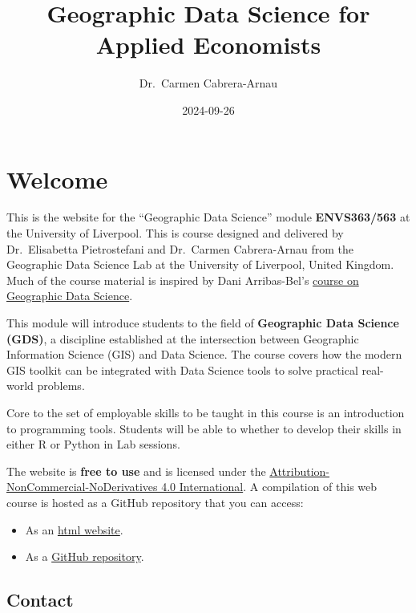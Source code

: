 \documentclass[
  letterpaper,
  DIV=11,
  numbers=noendperiod]{scrreprt}
\title{Geographic Data Science for Applied Economists}
\author{Dr.~Carmen Cabrera-Arnau}
\date{2024-09-26}
\providecommand{\tightlist}{%
  \setlength{\itemsep}{0pt}\setlength{\parskip}{0pt}}\usepackage{longtable,booktabs,array}
\renewcommand*\contentsname{Table of contents}
\newcommand\contentsname{Table of contents}
\begin{document}
\maketitle

\renewcommand*\contentsname{Table of contents}
{
\hypersetup{linkcolor=}
\setcounter{tocdepth}{2}
\tableofcontents
}


\chapter*{Welcome}\label{welcome}


This is the website for the ``Geographic Data Science'' module
\textbf{ENVS363/563} at the University of Liverpool. This is course
designed and delivered by Dr.~Elisabetta Pietrostefani and Dr.~Carmen
Cabrera-Arnau from the Geographic Data Science Lab at the University of
Liverpool, United Kingdom. Much of the course material is inspired by
Dani Arribas-Bel's
\href{https://darribas.org/gds_course/content/home.html}{course on
Geographic Data Science}.

This module will introduce students to the field of \textbf{Geographic
Data Science (GDS)}, a discipline established at the intersection
between Geographic Information Science (GIS) and Data Science. The
course covers how the modern GIS toolkit can be integrated with Data
Science tools to solve practical real-world problems.

Core to the set of employable skills to be taught in this course is an
introduction to programming tools. Students will be able to whether to
develop their skills in either R or Python in Lab sessions.

The website is \textbf{free to use} and is licensed under the
\href{https://creativecommons.org/licenses/by-nc-nd/4.0/}{Attribution-NonCommercial-NoDerivatives
4.0 International}. A compilation of this web course is hosted as a
GitHub repository that you can access:

\begin{itemize}
\tightlist
\item
  As an \href{https://pietrostefani.github.io/gds/}{html website}.
\item
  As a \href{https://github.com/pietrostefani/gds}{GitHub repository}.
\end{itemize}

\section*{Contact}\label{contact}
\end{document}
